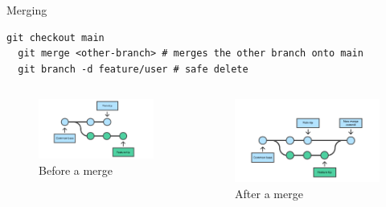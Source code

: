 \documentclass{beamer}
\begin{document}
\begin{frame}[fragile,t]{Merging}\vspace{10pt}
  \begin{lstlisting}[basicstyle=\ttfamily\tiny]
  git checkout main
  git merge <other-branch> # merges the other branch onto main
  git branch -d feature/user # safe delete\end{lstlisting}\vspace{10pt}

  \begin{columns}
    \begin{column}{0.5\textwidth}
      \begin{figure}
        \centering
        \includegraphics[scale=0.2]{screenshots/merge.png}
        \caption{Before a merge}
      \end{figure}
    \end{column}

    \begin{column}{0.5\textwidth}
      \begin{figure}
        \vspace{-15pt}
        \centering
        \includegraphics[scale=0.2]{screenshots/merge2.png}
        \caption{After a merge}
      \end{figure}
    \end{column}
  \end{columns}
\end{frame}
\end{document}

